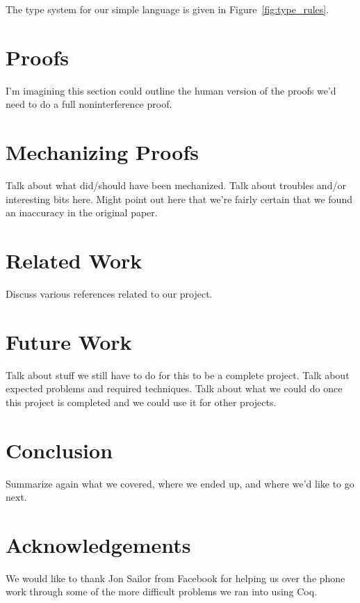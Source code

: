\documentclass[a4paper,twocolumn]{article}
\begin{document}
The type system for our simple language is given in Figure~\ref{fig:type_rules}.

\section{Proofs}

I'm imagining this section could outline the human version of the proofs we'd
need to do a full noninterference proof.

\section{Mechanizing Proofs}

Talk about what did/should have been mechanized.  Talk about troubles and/or
interesting bits here.  Might point out here that we're fairly certain that we
found an inaccuracy in the original paper.

\section{Related Work}

Discuss various references related to our project.

\section{Future Work}

Talk about stuff we still have to do for this to be a complete project.  Talk
about expected problems and required techniques.  Talk about what we could do
once this project is completed and we could use it for other projects.

\section{Conclusion}

Summarize again what we covered, where we ended up, and where we'd like to go
next.

\section*{Acknowledgements}

We would like to thank Jon Sailor from Facebook for helping us over the phone
work through some of the more difficult problems we ran into using Coq.



\end{document}
